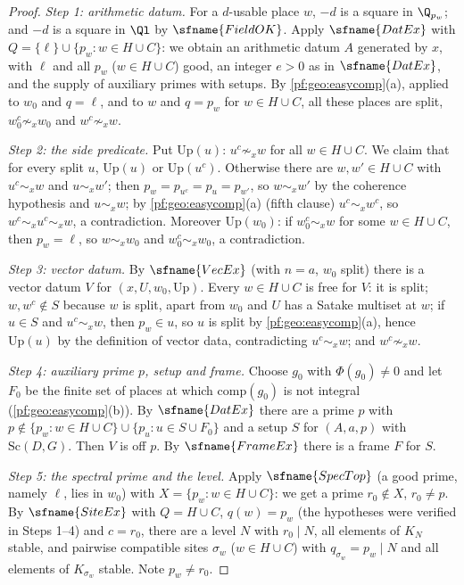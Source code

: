 \begin{proof}
\emph{Step 1: arithmetic datum.} For a $d$-usable place $w$, $-d$ is a square in $\Q_{p_w}$; and $-d$ is a square in $\Ql$ by
$\sfname{FieldOK}$. Apply $\sfname{DatEx}$ with $Q=\{\ell\}\cup\{p_w:w\in H\cup C\}$: we obtain an arithmetic datum $A$ generated by
$x$, with $\ell$ and all $p_w$ ($w\in H\cup C$) good, an integer $e>0$ as in $\sfname{DatEx}$, and the supply of auxiliary primes with
setups. By \cref{pf:geo:easycomp}(a), applied to $w_0$ and $q=\ell$, and to $w$ and $q=p_w$ for $w\in H\cup C$, all these places
are split, $w_0^c\not\sim_xw_0$ and $w^c\not\sim_xw$.

\emph{Step 2: the side predicate.} Put $\mathrm{Up}(u)$: $u^c\not\sim_xw$ for all $w\in H\cup C$. We claim that for every split $u$,
$\mathrm{Up}(u)$ or $\mathrm{Up}(u^c)$. Otherwise there are $w,w'\in H\cup C$ with $u^c\sim_xw$ and $u\sim_xw'$; then
$p_w=p_{u^c}=p_u=p_{w'}$, so $w\sim_xw'$ by the coherence hypothesis and $u\sim_xw$; by \cref{pf:geo:easycomp}(a) (fifth clause) $u^c\sim_xw^c$,
so $w^c\sim_xu^c\sim_xw$, a contradiction. Moreover $\mathrm{Up}(w_0)$: if $w_0^c\sim_xw$ for some $w\in H\cup C$, then $p_w=\ell$, so
$w\sim_xw_0$ and $w_0^c\sim_xw_0$, a contradiction.

\emph{Step 3: vector datum.} By $\sfname{VecEx}$ (with $n=a$, $w_0$ split) there is a vector datum $V$ for $(x,U,w_0,\mathrm{Up})$. Every
$w\in H\cup C$ is free for $V$: it is split; $w,w^c\notin S$ because $w$ is split, apart from $w_0$ and $U$ has a Satake multiset at $w$;
if $u\in S$ and $u^c\sim_xw$, then $p_w\in u$, so $u$ is split by \cref{pf:geo:easycomp}(a), hence $\mathrm{Up}(u)$ by the definition of
vector data, contradicting $u^c\sim_xw$; and $w^c\not\sim_xw$.

\emph{Step 4: auxiliary prime $p$, setup and frame.} Choose $g_0$ with $\Phi(g_0)\ne0$ and let $F_0$ be the finite set of places at
which $\mathrm{comp}(g_0)$ is not integral (\cref{pf:geo:easycomp}(b)). By $\sfname{DatEx}$ there are a prime $p$ with
$p\notin\{p_w:w\in H\cup C\}\cup\{p_u:u\in S\cup F_0\}$ and a setup $S$ for $(A,a,p)$ with $\mathrm{Sc}(D,G)$. Then $V$ is off $p$. By
$\sfname{FrameEx}$ there is a frame $F$ for $S$.

\emph{Step 5: the spectral prime and the level.} Apply $\sfname{SpecTop}$ (a good prime, namely $\ell$, lies in $w_0$) with
$X=\{p_w:w\in H\cup C\}$: we get a prime $r_0\notin X$, $r_0\ne p$. By $\sfname{SiteEx}$ with $Q=H\cup C$, $q(w)=p_w$ (the hypotheses
were verified in Steps 1--4) and $c=r_0$, there are a level $N$ with $r_0\mid N$, all elements of $K_N$ stable, and pairwise
compatible sites $\sigma_w$ ($w\in H\cup C$) with $q_{\sigma_w}=p_w\mid N$ and all elements of $K_{\sigma_w}$ stable. Note $p_w\ne r_0$.


\end{proof}

